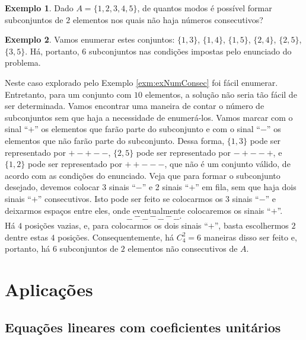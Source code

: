 \documentclass[]{book}
\theoremstyle{definition}
\theoremstyle{definition}
\newtheorem{example}{Exemplo}[chapter]
\theoremstyle{definition}
\theoremstyle{remark}
\begin{document}
\begin{example}
\protect\hypertarget{exm:unnamed-chunk-83}{}{\label{exm:unnamed-chunk-83} }Dado \(A = \{1,2,3,4,5\}\), de quantos modos é possível formar subconjuntos de \(2\) elementos nos quais não haja números consecutivos?
\end{example}

\begin{example}
\protect\hypertarget{exm:exNumConsec}{}{\label{exm:exNumConsec} }Vamos enumerar estes conjuntos: \(\{1,3\}\), \(\{1,4\}\), \(\{1,5\}\), \(\{2,4\}\), \(\{2,5\}\), \(\{3,5\}\).
Há, portanto, \(6\) subconjuntos nas condições impostas pelo enunciado do problema.
\end{example}

Neste caso explorado pelo Exemplo \ref{exm:exNumConsec} foi fácil enumerar.
Entretanto, para um conjunto com \(10\) elementos, a solução não seria tão fácil de ser determinada.
Vamos encontrar uma maneira de contar o número de subconjuntos sem que haja a necessidade de enumerá-los.
Vamos marcar com o sinal ``\(+\)'' os elementos que farão parte do subconjunto e com o sinal ``\(-\)'' os elementos que não farão parte do subconjunto.
Dessa forma, \(\{1,3\}\) pode ser representado por \(+-+--\), \(\{2,5\}\) pode ser representado por \(-+--+\), e \(\{1,2\}\) pode ser representado por \(++---\), que não é um conjunto válido, de acordo com as condições do enunciado.
Veja que para formar o subconjunto desejado, devemos colocar 3 sinais ``\(-\)'' e 2 sinais ``\(+\)'' em fila, sem que haja dois sinais ``\(+\)'' consecutivos.
Isto pode ser feito se colocarmos os \(3\) sinais ``\(-\)'' e deixarmos espaços entre eles, onde eventualmente colocaremos os sinais ``\(+\)''.
\[\_\_ - \_\_ - \_\_ - \_\_ .\]
Há \(4\) posições vazias, e, para colocarmos os dois sinais ``\(+\)'', basta escolhermos \(2\) dentre estas \(4\) posições.
Consequentemente, há \(C^2_4=6\) maneiras disso ser feito e, portanto, há \(6\) subconjuntos de \(2\) elementos não consecutivos de \(A\).

\hypertarget{aplicauxe7uxf5es}{%
\section{Aplicações}\label{aplicauxe7uxf5es}}

\hypertarget{equauxe7uxf5es-lineares-com-coeficientes-unituxe1rios}{%
\subsection{Equações lineares com coeficientes unitários}\label{equauxe7uxf5es-lineares-com-coeficientes-unituxe1rios}}
\end{document}
